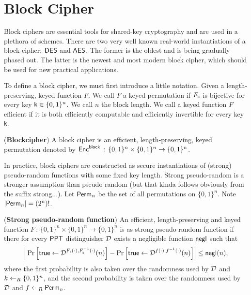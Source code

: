 \section{Block Cipher}

Block ciphers are essential tools for shared-key cryptography and are used in a plethora of schemes. There are two very well known real-world instantiations of a block cipher: $\mathsf{DES}$ and $\mathsf{AES}$. The former is the oldest and is being gradually phased out. The latter is the newest and most modern block cipher, which should be used for new practical applications.

To define a block cipher, we must first introduce a little notation. Given a length-preserving, keyed function $F$. We call $F$ a keyed permutation if $F_{\mathsf{k}}$ is bijective for every key $\mathsf{k}\in\{0,1\}^n$. We call $n$ the block length. We call a keyed function $F$ efficient if it is both efficiently computable and efficiently invertible for every key $\mathsf{k}$. 

\begin{defn}
(\textbf{Blockcipher}) A block cipher is an efficient, length-preserving, keyed permutation denoted by $\operatorname{\mathsf{Enc}^{\mathsf{block}}}\, :\, \{0,1\}^n\times\{0,1\}^n\rightarrow \{0,1\}^n$.
\end{defn}

In practice, block ciphers are constructed as secure instantiations of (strong) pseudo-random functions with some fixed key length. Strong pseudo-random is a stronger assumption than pseudo-random   (but that kinda follows obviously from the suffix strong...). Let $\mathsf{Perm}_n$ be the set of all permutations on $\{0,1\}^n$. Note $\vert \mathsf{Perm}_n \vert = (2^n)!$.  

\begin{defn}
(\textbf{Strong pseudo-random function}) An efficient, length-preserving and keyed function $F\, : \, \{0,1\}^n\times\{0,1\}^n\rightarrow\{0,1\}^n$ is as strong pseudo-random function if there for every $\mathsf{PPT}$ distinguisher $\operatorname{\mathcal{D}}$ exists a negligible function $\operatorname{\mathsf{negl}}$ such that
\begin{align*}
	\left\vert \mathstrut\operatorname{Pr}\left[{\mathsf{true}\leftarrow \operatorname{\mathcal{D}}^{F_{\mathsf{k}}(\cdot),F_{\mathsf{k}}^{-1}(\cdot)}(n)}\right] - \operatorname{Pr}\left[{\mathsf{true}\leftarrow \operatorname{\mathcal{D}}^{f(\cdot),f^{-1}(\cdot)}(n)}\right]\right\vert \leq \operatorname{\mathsf{negl}}(n),
\end{align*}
where the first probability is also taken over the randomness used by $\mathcal{D}$ and $k\leftarrow_R\{0,1\}^n$, and the second probability is taken over the randomness used by $\mathcal{D}$ and $f\leftarrow_R\mathsf{Perm}_n$. 
\end{defn}


